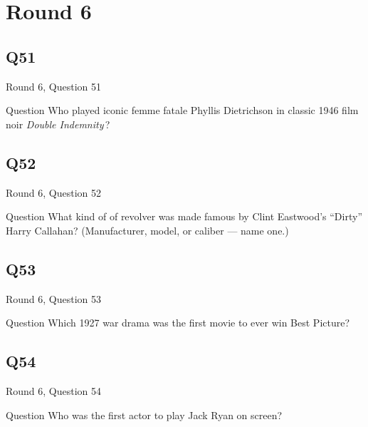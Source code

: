 \documentclass[11pt]{beamer}
\begin{document}
\section{Round 6}
    

\subsection*{Q51}
\begin{frame}[t]{Round 6, Question 51}
\vspace{2em}
\begin{block}{Question}
Who played iconic femme fatale Phyllis Dietrichson in classic 1946 film noir \emph{Double Indemnity}\,?
\end{block}
\end{frame}
    

\subsection*{Q52}
\begin{frame}[t]{Round 6, Question 52}
\vspace{2em}
\begin{block}{Question}
What kind of of revolver was made famous by Clint Eastwood's ``Dirty'' Harry Callahan? (Manufacturer, model, or caliber — name one.)
\end{block}
\end{frame}
    

\subsection*{Q53}
\begin{frame}[t]{Round 6, Question 53}
\vspace{2em}
\begin{block}{Question}
Which 1927 war drama was the first movie to ever win Best Picture?
\end{block}
\end{frame}
    

\subsection*{Q54}
\begin{frame}[t]{Round 6, Question 54}
\vspace{2em}
\begin{block}{Question}
Who was the first actor to play Jack Ryan on screen?
\end{block}
\end{frame}
    
\end{document}
